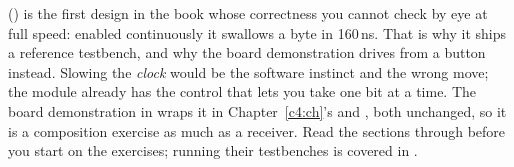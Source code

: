  () is the first design in the book
whose correctness you cannot check by eye at full speed: enabled continuously it swallows a byte in
160\,ns. That is why it ships a reference testbench, and why the board demonstration drives
 from a button instead. Slowing the \emph{clock} would be the software instinct
and the wrong move; the module already has the control that lets you take one bit at a time. The
board demonstration in  wraps it in Chapter~\ref{c4:ch}'s  and
, both unchanged, so it is a composition exercise as much as a receiver. Read the
sections through before you start on the exercises; running their testbenches is covered in
.




